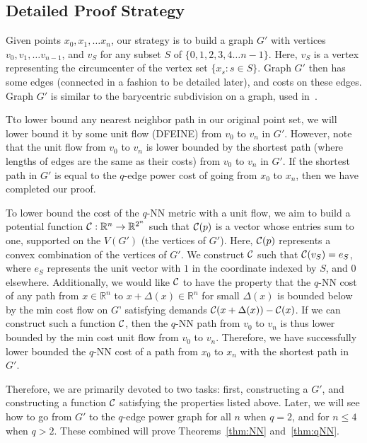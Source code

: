 \subsection{Detailed Proof Strategy}

Given points $x_0, x_1, \ldots x_n$, our strategy is to build a graph $G'$ with
vertices $v_0, v_1, \ldots v_{n-1}$, and $v_S$ for any subset $S$ of
$\{0,1,2,3,4 \ldots n-1 \}$. Here, $v_S$ is a vertex representing the
circumcenter of the vertex set $\{x_s: s \in S\}$. Graph $G'$ then has some
edges (connected in a fashion to be detailed later), and costs on these edges.
Graph $G'$ is similar to the barycentric subdivision on a graph, used
in~\cite{}.

Tto lower bound any nearest neighbor path in our original point set, we will
lower bound it by some unit flow (DFEINE) from $v_0$ to $v_n$ in $G'$. However,
note that the unit flow from $v_0$ to $v_n$ is lower bounded by the shortest
path (where lengths of edges are the same as their costs) from $v_0$ to $v_n$
in $G'$. If the shortest path in $G'$ is equal to the $q$-edge power cost of
going from $x_0$ to $x_n$, then we have completed our proof.

To lower bound the cost of the $q$-NN metric with a unit flow, we aim to build
a potential function $\mathcal{C}:\mathbb{R}^n \rightarrow \mathbb{R}^{2^n}$ such
that $\mathcal{C}(p)$ is a vector whose entries sum to one, supported on the $ V(G')$ (the vertices of
$G'$). Here, $\mathcal{C}(p)$
represents a convex combination of the vertices of $G'$. We construct $\mathcal{C}$
such that $\mathcal{C}(v_S) = e_S$, where $e_S$ represents the unit vector with $1$
in the coordinate indexed by $S$, and $0$ elsewhere. Additionally, we would
like $\mathcal{C}$ to have
the property that the $q$-NN cost of any path from $x \in \mathbb{R}^n$ to
$x+\Delta(x) \in \mathbb{R}^n$ for small $\Delta(x)$ is
bounded below by the min cost flow on $G’$ satisfying demands
$\mathcal{C}(x+\Delta(x)) - \mathcal{C}(x)$. If we can construct such a function $\mathcal{C}$,
then the $q$-NN path from $v_0$ to $v_n$ is thus lower bounded by the min cost
unit flow from $v_0$ to $v_n$.
 Therefore, we have successfully lower bounded
the $q$-NN cost of a path from $x_0$ to $x_n$ with the shortest path in $G'$.

Therefore, we are primarily devoted to two tasks: first,
constructing a $G'$, and constructing a function
$\mathcal{C}$ satisfying the properties listed above.  Later, we will see how to
go from $G'$ to the $q$-edge power graph for all $n$ when $q=2$, and for $
n\leq 4$ when $q > 2$. These combined will prove Theorems~\ref{thm:NN}
and~\ref{thm:qNN}.
